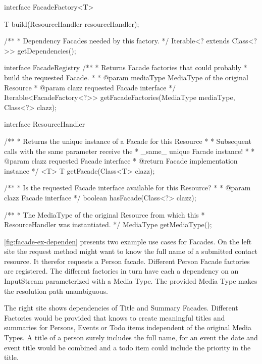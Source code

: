 \documentclass[12pt,a4paper]{scrartcl}		%
\begin{document}
\begin{javalisting}[label=fig:datafacades-api,
                    float=p,
                   caption={API of the ResourceFacades component}]
interface FacadeFactory<T> {
 T build(ResourceHandler resourceHandler);

 /**
  * Dependency Facades needed by this factory.
  */
 Iterable<? extends Class<?>> getDependencies();
}

interface FacadeRegistry {
 /**
  * Returns Facade factories that could probably
  * build the requested Facade.
  *
  * @param mediaType MediaType of the original Resource
  * @param clazz requested Facade interface
  */
 Iterable<FacadeFactory<?>> getFacadeFactories(MediaType mediaType,
                                               Class<?> clazz);
}

interface ResourceHandler {
 /**
  * Returns the unique instance of a Facade for this Resource
  *
  * Subsequent calls with the same parameter receive the
  * _same_ unique Facade instance!
  *
  * @param clazz requested Facade interface
  * @return Facade implementation instance
  */
 <T> T getFacade(Class<T> clazz);

 /**
  * Is the requested Facade interface available for this Resource?
  *
  * @param clazz Facade interface
  */
 boolean hasFacade(Class<?> clazz);

 /**
  * The MediaType of the original Resource from which this 
  * ResourceHandler was instantiated.
  */
 MediaType getMediaType();
}
\end{javalisting}

\autoref{fig:facade-ex-dependen} presents two example use cases for Facades. On
the left site the request method might want to know the full name of a submitted
contact resource. It therefor requests a Person facade. Different Person Facade
factories are registered. The different factories in turn have each a dependency
on an InputStream parameterized with a Media Type. The provided Media Type makes
the resolution path unambiguous.

The right site shows dependencies of Title and Summary Facades. Different
Factories would be provided that knows to create meaningful titles and summaries
for Persons, Events or Todo items independent of the original Media Types. A
title of a person surely includes the full name, for an event the date and event
title would be combined and a todo item could include the priority in the title.
\end{document}
